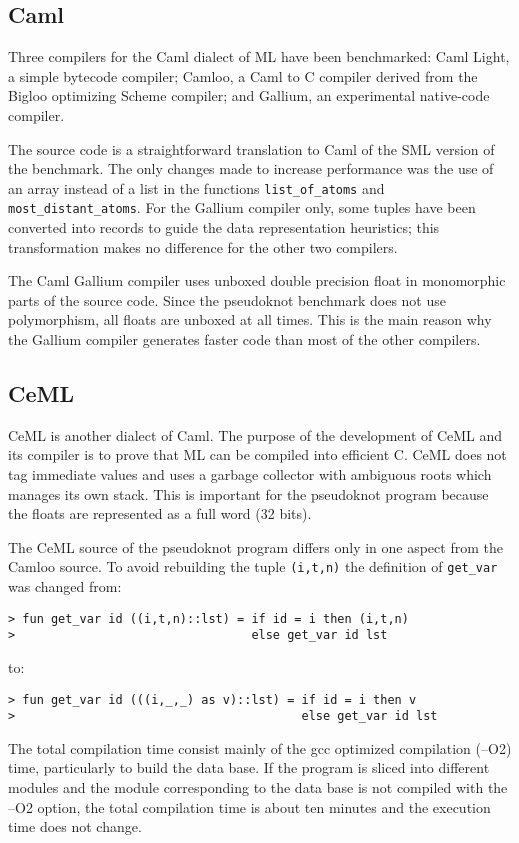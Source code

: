 \subsection{Caml}
Three compilers for the Caml dialect of ML have been benchmarked: Caml
Light, a simple bytecode compiler; Camloo, a Caml to C compiler derived
from the Bigloo optimizing Scheme compiler; and Gallium, an
experimental native-code compiler.

The source code is a straightforward translation to Caml of the SML
version of the benchmark. The only changes made to increase performance
was the use of an array instead of a list in the functions
\verb|list_of_atoms| and \verb|most_distant_atoms|. For the Gallium
compiler only, some tuples have been converted into records to guide
the data representation heuristics; this transformation makes no
difference for the other two compilers.

The Caml Gallium compiler uses unboxed double precision float in
monomorphic parts of the source code. Since the pseudoknot benchmark does
not use polymorphism, all floats are unboxed at all times. This is the
main reason why the Gallium compiler generates faster code than most
of the other compilers.

\subsection{CeML}
CeML is another dialect of Caml. The purpose of the development of CeML
and its compiler is to prove that ML can be compiled into efficient C.
CeML does not tag immediate values and uses a garbage collector with
ambiguous roots which manages its own stack. This is important for the
pseudoknot program because the floats are represented as a full word
(32 bits).

The CeML source of the pseudoknot program differs only in one aspect
from the Camloo source. To avoid rebuilding the tuple \verb=(i,t,n)=
the definition of \verb=get_var= was changed from:
\begin{verbatim}
> fun get_var id ((i,t,n)::lst) = if id = i then (i,t,n)
>                                 else get_var id lst
\end{verbatim}
to:
\begin{verbatim}
> fun get_var id (((i,_,_) as v)::lst) = if id = i then v
>                                        else get_var id lst
\end{verbatim}

The total compilation time consist mainly of the gcc optimized
compilation (--O2) time, particularly to build the data base. If the
program is sliced into different modules and the module corresponding
to the data base is not compiled with the --O2 option, the total
compilation time is about ten minutes and the execution time does not
change.

